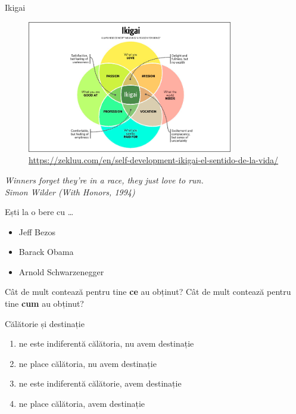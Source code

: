 \documentclass{simple}
\begin{document}
\begin{frame}{Ikigai}
  \begin{figure}
    \centering
    \includegraphics[width=0.8\textwidth]{img/ikigai.png} \\
    \tiny{\url{https://zekluu.com/en/self-development-ikigai-el-sentido-de-la-vida/}}
  \end{figure}
\end{frame}

\begin{frame}{}
  \centering
  \pause
  \textit{Winners forget they're in a race, they just love to run.} \\
  \vspace{3mm}
  \hfill \textit{Simon Wilder (With Honors, 1994)} \\
\end{frame}

\begin{frame}{Ești la o bere cu \ldots}
  \begin{itemize}
    \pause
    \item Jeff Bezos
    \pause
    \item Barack Obama
    \pause
    \item Arnold Schwarzenegger
  \end{itemize}
  \pause
  Cât de mult contează pentru tine \textbf{ce} au obținut? Cât de mult contează pentru tine \textbf{cum} au obținut?
\end{frame}

\begin{frame}{Călătorie și destinație}
  \begin{enumerate}
    \item ne este indiferentă călătoria, nu avem destinație
    \item ne place călătoria, nu avem destinație
    \item ne este indiferentă călătorie, avem destinație
    \item ne place călătoria, avem destinație
  \end{enumerate}
\end{frame}
\end{document}
